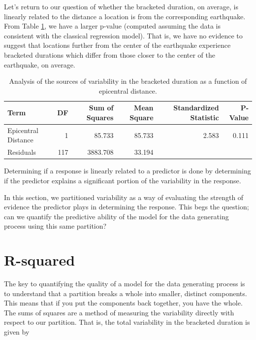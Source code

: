 \documentclass[]{book}
\theoremstyle{plain}
\theoremstyle{mydefn}
\theoremstyle{myexmpl}
\theoremstyle{remark}
\let\BeginKnitrBlock\begin \let\EndKnitrBlock\end
\let\BeginKnitrBlock\begin \let\EndKnitrBlock\end
\begin{document}
Let's return to our question of whether the bracketed duration, on
average, is linearly related to the distance a location is from the
corresponding earthquake. From Table \ref{tab:regquality-anova}, we have
a larger p-value (computed assuming the data is consistent with the
classical regression model). That is, we have no evidence to suggest
that locations further from the center of the earthquake experience
bracketed durations which differ from those closer to the center of the
earthquake, on average.

\begin{table}

\caption{\label{tab:regquality-anova}Analysis of the sources of variability in the bracketed duration as a function of epicentral distance.}
\centering
\begin{tabular}[t]{l|r|r|r|r|r}
\hline
Term & DF & Sum of Squares & Mean Square & Standardized Statistic & P-Value\\
\hline
Epicentral Distance & 1 & 85.733 & 85.733 & 2.583 & 0.111\\
\hline
Residuals & 117 & 3883.708 & 33.194 &  & \\
\hline
\end{tabular}
\end{table}

\BeginKnitrBlock{rmdkeyidea}
Determining if a response is linearly related to a predictor is done by
determining if the predictor explains a significant portion of the
variability in the response.
\EndKnitrBlock{rmdkeyidea}

In this section, we partitioned variability as a way of evaluating the
strength of evidence the predictor plays in determining the response.
This begs the question; can we quantify the predictive ability of the
model for the data generating process using this same partition?

\section{R-squared}\label{r-squared}

The key to quantifying the quality of a model for the data generating
process is to understand that a partition breaks a whole into smaller,
distinct components. This means that if you put the components back
together, you have the whole. The sums of squares are a method of
measuring the variability directly with respect to our partition. That
is, the total variability in the bracketed duration is given by
\end{document}
